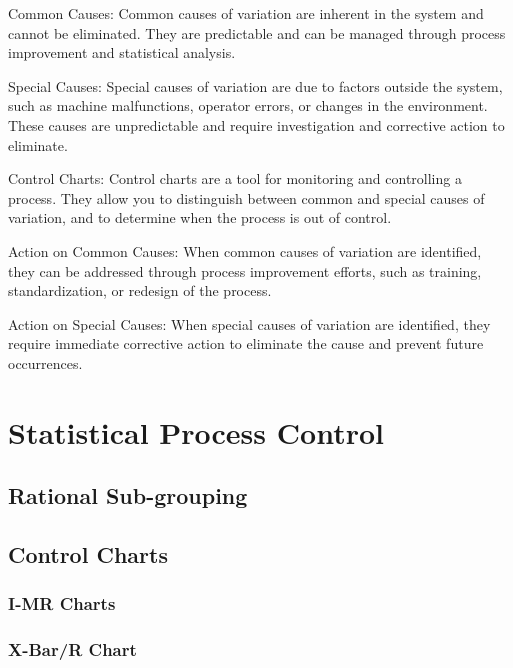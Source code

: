 \documentclass[11pt]{article}
\begin{document}
Common Causes: Common causes of variation are inherent in the system and
cannot be eliminated. They are predictable and can be managed through
process improvement and statistical analysis.

Special Causes: Special causes of variation are due to factors outside
the system, such as machine malfunctions, operator errors, or changes in
the environment. These causes are unpredictable and require
investigation and corrective action to eliminate.

Control Charts: Control charts are a tool for monitoring and controlling
a process. They allow you to distinguish between common and special
causes of variation, and to determine when the process is out of
control.

Action on Common Causes: When common causes of variation are identified,
they can be addressed through process improvement efforts, such as
training, standardization, or redesign of the process.

Action on Special Causes: When special causes of variation are
identified, they require immediate corrective action to eliminate the
cause and prevent future occurrences.

    \hypertarget{statistical-process-control}{%
\section{Statistical Process
Control}\label{statistical-process-control}}

    \hypertarget{rational-sub-grouping}{%
\subsection{Rational Sub-grouping}\label{rational-sub-grouping}}

\hypertarget{control-charts}{%
\subsection{Control Charts}\label{control-charts}}

\hypertarget{i-mr-charts}{%
\subsubsection{I-MR Charts}\label{i-mr-charts}}

\hypertarget{x-barr-chart}{%
\subsubsection{X-Bar/R Chart}\label{x-barr-chart}}
\end{document}
